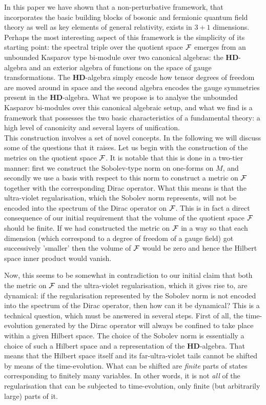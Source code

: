 \documentclass[letterpaper,12pt]{article}
\def\cf{{\cal F}}
\begin{document}
In this paper we have shown that a non-perturbative framework, that incorporates the basic building blocks of bosonic and fermionic quantum field theory as well as key elements of general relativity, exists in $3+1$ dimensions. 
Perhaps the most interesting aspect of this framework is the simplicity of its starting point: the spectral triple over the quotient space $\cf$ emerges from an unbounded Kasparov type bi-module over two canonical algebras: the $\mathbf{HD}$-algebra and an exterior algebra of functions on the space of gauge transformations. The $\mathbf{HD}$-algebra simply encode how tensor degrees of freedom are moved around in space and the second algebra encodes the gauge symmetries present in the $\mathbf{HD}$-algebra. What we propose is to analyse the unbounded Kasparov bi-modules over this canonical algebraic setup, and what we find is a framework that possesses the two basic characteristics of a fundamental theory: a high level of canonicity and several layers of unification.\\



This construction involves a set of novel concepts. In the following we will discuss some of the questions that it raises.
Let us begin with the construction of the metrics on the quotient space $\cf$. It is notable that this is done in a two-tier manner: first we construct the Sobolev-type norm on one-forms on $M$, and secondly we use a basis with respect to this norm to construct a metric on $\cf$ together with the corresponding Dirac operator. What this means is that the ultra-violet regularisation, which the Sobolev norm represents, will not be encoded into the spectrum of the Dirac operator on $\cf$. This is in fact a direct consequence of our initial requirement that the volume of the quotient space $\cf$ should be finite. If we had constructed the metric on $\cf$ in a way so that each dimension (which correspond to a degree of freedom of a gauge field) got successively 'smaller' then the volume of $\cf$ would be zero and hence the Hilbert space inner product would vanish.


Now, this seems to be somewhat in contradiction to our initial claim that both the metric on $\cf$ and the ultra-violet regularisation, which it gives rise to, are dynamical: if the regularisation represented by the Sobolev norm is not encoded into the spectrum of the Dirac operator, then how can it be dynamical? This is a technical question, which must be answered in several steps. First of all, the time-evolution generated by the Dirac operator will always be confined to take place within a given Hilbert space. The choice of the Sobolev norm is essentially a choice of such a Hilbert space and a representation of the $\mathbf{HD}$-algebra. That means that the Hilbert space itself and its far-ultra-violet tails cannot be shifted by means of the time-evolution. What can be shifted are {\it finite} parts of states corresponding to finitely many variables. In other words, it is not {\it all} of the regularisation that can be subjected to time-evolution, only finite (but arbitrarily large) parts of it.  
\end{document}
